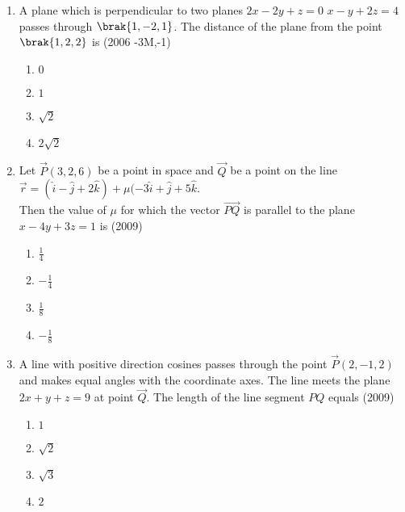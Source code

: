 \begin{enumerate}
\begin{enumerate}
\end{enumerate}
    \item A plane which is perpendicular to two planes $2x-2y+z=0$  $x-y+2z=4$ passes through $\brak{1,-2,1}$. The distance of the plane from the point $\brak{1,2,2}$ is
    \hfill{(2006 -3M,-1)}
    \begin{multicols}{2} 
    	\begin{enumerate}
    		\item $0$
    		\item $1$
    		\item $\sqrt{2}$
    		\item $2\sqrt{2}$
    	\end{enumerate}
    \end{multicols}
    \item Let $\vec{P}(3,2,6)$ be a point in space and $\vec{Q}$ be a point on the line \\ 
    $\vec{r} = (\hat{i} - \hat{j} + 2\hat{k}) + \mu(-3\hat{i} +\hat{j}+5\hat{k}.$
    \\ Then the value of $\mu$ for which the vector $\overrightarrow{PQ}$ is parallel to the plane $x-4y+3z=1$ is
    \hfill{(2009)}
    \begin{multicols}{2}
    	\begin{enumerate}
    		\item $\frac{1}{4}$
    		\item $-\frac{1}{4}$
    		\item $\frac{1}{8}$
    		\item $-\frac{1}{8}$
    	\end{enumerate}
    \end{multicols}
    \item A line with positive direction cosines passes through the point $\vec{P}(2,-1,2)$ and makes equal angles with the coordinate axes. The line meets the plane $2x+y+z=9$ at point $\vec{Q}$. The length of the line segment $PQ$ equals 
    \hfill{(2009)}
    \begin{multicols}{2}
    	\begin{enumerate}
    		\item $1$
    		\item $\sqrt{2}$
    		\item $\sqrt{3}$
    		\item $2$

\end{enumerate}
\end{multicols}
\end{enumerate}

